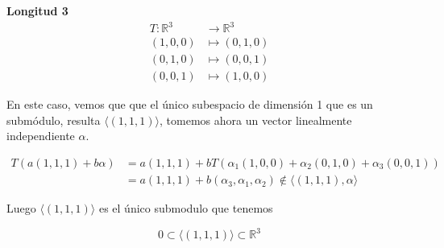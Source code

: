 \textbf{Longitud 3}%
\[
\begin{aligned}
  T:\mathbb{R}^3 &\rightarrow \mathbb{R}^3\\
  (1,0,0) &\mapsto (0,1,0)\\
  (0,1,0) &\mapsto (0,0,1)\\
  (0,0,1) &\mapsto (1,0,0)
\end{aligned}
\]

En este caso, vemos que que el único subespacio de dimensión 1 que es un
submódulo, resulta \(\langle (1,1,1) \rangle\), tomemos ahora un vector
linealmente independiente \(\alpha\).

\[
  \begin{aligned}
  T(a(1,1,1) + b\alpha) &= a(1,1,1) + bT(\alpha_1(1,0,0) + \alpha_2(0,1,0) +
  \alpha_3(0,0,1))\\
  &= a(1,1,1) + b(\alpha_3, \alpha_1, \alpha_2) \not \in
  \langle(1,1,1),\alpha\rangle
  \end{aligned}
\]

Luego \(\langle (1,1,1)\rangle\) es el único submodulo que tenemos

\[
        0 \subset \langle (1,1,1) \rangle \subset \mathbb{R}^3
\]
